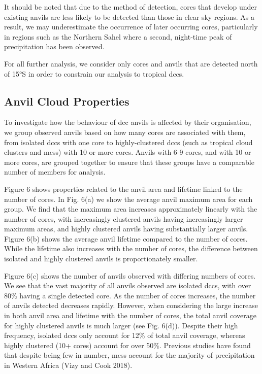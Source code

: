 It should be noted that due to the method of detection, cores that
develop under existing anvils are less likely to be detected than those
in clear sky regions. As a result, we may underestimate the occurrence
of later occurring cores, particularly in regions such as the Northern
Sahel where a second, night-time peak of precipitation has been
observed.

For all further analysis, we consider only cores and anvils that are
detected north of 15°S in order to constrain our analysis to tropical
\acrshort{dcc}s.

\subsection{Anvil Cloud Properties}

To investigate how the behaviour of \acrshort{dcc} anvils is affected by their
organisation, we group observed anvils based on how many cores are
associated with them, from isolated \acrshort{dcc}s with one core to
highly-clustered \acrshort{dcc}s (such as tropical cloud clusters and \acrshort{mcs}s) with 10
or more cores. Anvils with 6-9 cores, and with 10 or more cores, are
grouped together to ensure that these groups have a comparable number of
members for analysis.

Figure 6 shows properties related to the anvil area and lifetime linked
to the number of cores. In Fig. 6(a) we show the average anvil maximum
area for each group. We find that the maximum area increases
approximately linearly with the number of cores, with increasingly
clustered anvils having increasingly larger maximum areas, and highly
clustered anvils having substantially larger anvils. Figure 6(b) shows
the average anvil lifetime compared to the number of cores. While the
lifetime also increases with the number of cores, the difference between
isolated and highly clustered anvils is proportionately smaller.

Figure 6(c) shows the number of anvils observed with differing numbers
of cores. We see that the vast majority of all anvils observed are
isolated \acrshort{dcc}s, with over 80\% having a single detected core. As the
number of cores increases, the number of anvils detected decreases
rapidly. However, when considering the large increase in both anvil area
and lifetime with the number of cores, the total anvil coverage for
highly clustered anvils is much larger (see Fig. 6(d)). Despite their
high frequency, isolated \acrshort{dcc}s only account for 12\% of total anvil
coverage, whereas highly clustered (10+ cores) account for over 50\%.
Previous studies have found that despite being few in number, \acrshort{mcs}s
account for the majority of precipitation in Western Africa (Vizy and
Cook 2018).

